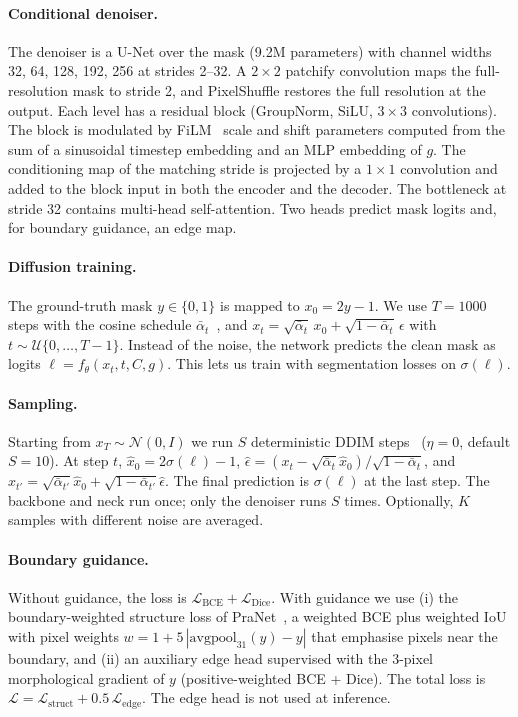 \documentclass[10pt,twocolumn,letterpaper]{article}
\begin{document}
\paragraph{Conditional denoiser.} The denoiser is a U-Net over the mask (9.2M parameters) with channel widths 32, 64, 128, 192, 256 at strides 2--32. A $2\times2$ patchify convolution maps the full-resolution mask to stride 2, and PixelShuffle restores the full resolution at the output. Each level has a residual block (GroupNorm, SiLU, $3\times3$ convolutions). The block is modulated by FiLM~\cite{perez2018film} scale and shift parameters computed from the sum of a sinusoidal timestep embedding and an MLP embedding of $g$. The conditioning map of the matching stride is projected by a $1\times1$ convolution and added to the block input in both the encoder and the decoder. The bottleneck at stride 32 contains multi-head self-attention. Two heads predict mask logits and, for boundary guidance, an edge map.

\paragraph{Diffusion training.} The ground-truth mask $y\in\{0,1\}$ is mapped to $x_0 = 2y-1$. We use $T=1000$ steps with the cosine schedule $\bar\alpha_t$~\cite{nichol2021improved}, and $x_t = \sqrt{\bar\alpha_t}\,x_0 + \sqrt{1-\bar\alpha_t}\,\epsilon$ with $t\sim\mathcal{U}\{0,\dots,T{-}1\}$. Instead of the noise, the network predicts the clean mask as logits $\ell = f_\theta(x_t, t, C, g)$. This lets us train with segmentation losses on $\sigma(\ell)$.

\paragraph{Sampling.} Starting from $x_{T}\sim\mathcal{N}(0,I)$ we run $S$ deterministic DDIM steps~\cite{song2021ddim} ($\eta=0$, default $S=10$). At step $t$, $\hat{x}_0 = 2\sigma(\ell)-1$, $\hat\epsilon = (x_t-\sqrt{\bar\alpha_t}\hat{x}_0)/\sqrt{1-\bar\alpha_t}$, and $x_{t'} = \sqrt{\bar\alpha_{t'}}\hat{x}_0+\sqrt{1-\bar\alpha_{t'}}\hat\epsilon$. The final prediction is $\sigma(\ell)$ at the last step. The backbone and neck run once; only the denoiser runs $S$ times. Optionally, $K$ samples with different noise are averaged.

\paragraph{Boundary guidance.} Without guidance, the loss is $\mathcal{L}_\text{BCE}+\mathcal{L}_\text{Dice}$. With guidance we use (i) the boundary-weighted structure loss of PraNet~\cite{fan2020pranet}, a weighted BCE plus weighted IoU with pixel weights $w = 1 + 5\,|\mathrm{avgpool}_{31}(y) - y|$ that emphasise pixels near the boundary, and (ii) an auxiliary edge head supervised with the 3-pixel morphological gradient of $y$ (positive-weighted BCE + Dice). The total loss is $\mathcal{L} = \mathcal{L}_\text{struct} + 0.5\,\mathcal{L}_\text{edge}$. The edge head is not used at inference.
\end{document}
